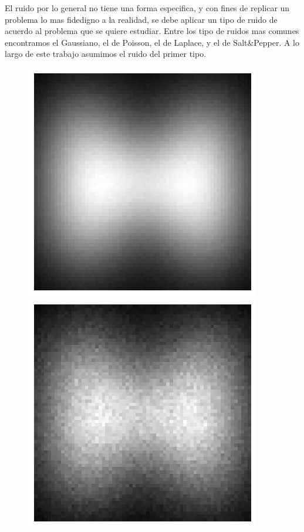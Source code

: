 \documentclass[12pt, oneside]{book}
\begin{document}
	El ruido por lo general no tiene una forma especifica, y con fines de replicar un problema lo mas fidedigno a la realidad, se debe aplicar un tipo de ruido de acuerdo al problema que se quiere estudiar. Entre los tipo de ruidos mas comunes encontramos el Gaussiano, el de Poisson, el de Laplace, y el de Salt\&Pepper. A lo largo de este trabajo asumimos el ruido del primer tipo. 
	
	\begin{figure}[H]
		\centering
		\includegraphics[scale=0.3]{Imagenes/H_Gauss.png}
		\includegraphics[scale=0.3]{Imagenes/H_Poisson.png}

\end{figure}
\end{document}
